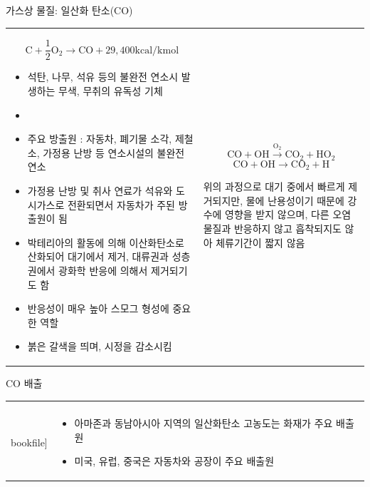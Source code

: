 \begin{frame}[t]{가스상 물질: 일산화 탄소(CO)}
	\begin{tabular}{ll}
		\begin{minipage}[t]{0.475\textwidth}\scriptsize
			$$
				\mathrm{C}+\frac{1}{2} \mathrm{O}_{2} \longrightarrow \mathrm{CO}+29,400 \mathrm{kcal} / \mathrm{kmol}
			$$
			\begin{itemize}
				\item 석탄, 나무, 석유 등의 불완전 연소시 발생하는 무색, 무취의 유독성 기체
				\item 
				\item 주요 방출원 : 자동차, 폐기물 소각, 제철소, 가정용 난방 등 연소시설의 불완전 연소
				\item 가정용 난방 및 취사 연료가 석유와 도시가스로 전환되면서 자동차가 주된 방출원이 됨
				\item 박테리아의 활동에 의해 이산화탄소로 산화되어 대기에서 제거, 대류권과 성층권에서 광화학 반응에 의해서 제거되기도 함
				\item 반응성이 매우 높아 스모그 형성에 중요한 역할
				\item 붉은 갈색을 띄며, 시정을 감소시킴
			\end{itemize}

		\end{minipage}	
		&
		\begin{minipage}[t]{0.475\textwidth} \scriptsize	
			
			$$
				\mathrm{CO}+\mathrm{OH} \stackrel{\mathrm{O}_{2}}{\longrightarrow} \mathrm{CO}_{2}+\mathrm{HO}_{2} 
			$$
			$$
				\mathrm{CO}+\mathrm{OH} \longrightarrow \mathrm{CO}_{2}+\mathrm{H}
			$$
				
			위의 과정으로 대기 중에서 빠르게 제거되지만, 물에 난용성이기 때문에 강수에 영향을 받지 않으며, 다른 오염물질과 반응하지 않고 흡착되지도 않아 체류기간이 짧지 않음
			
		\end{minipage}
	\end{tabular}
\end{frame}



\begin{frame}[t]{CO 배출}
	\begin{tabular}{ll}
		\begin{minipage}[t]{0.5\textwidth}\scriptsize
			\begin{figure}[t]
				\texttt{[image: \\bookfile]}
			\end{figure}
		\end{minipage}	
		&
		\begin{minipage}[t]{0.45\textwidth} \scriptsize	
			\begin{itemize}
				\item 아마존과 동남아시아 지역의 일산화탄소 고농도는 화재가 주요 배출원
				\item 미국, 유럽, 중국은 자동차와 공장이 주요 배출원
			\end{itemize}
		\end{minipage}
	\end{tabular}
\end{frame}





